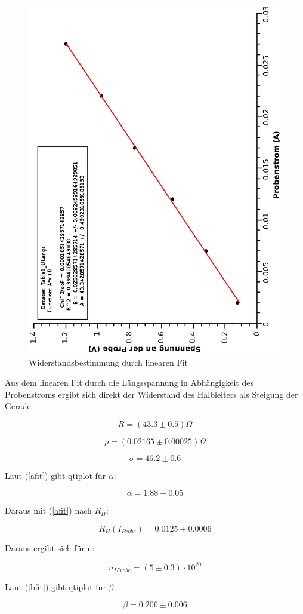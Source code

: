 \documentclass[12pt,a4paper,twopage]{article}
\begin{document}
\subsection*{}

\begin{figure}
\begin{center}

\includegraphics[width=0.4\linewidth, angle=-90]{widerstand.eps}
\caption{Widerstandsbestimmung durch linearen Fit}
\end{center}
\end{figure}

Aus dem linearen Fit durch die Längsspannung in Abhängigkeit des Probenstroms ergibt sich direkt der Widerstand des Halbleiters als Steigung der Gerade:

$$R = (43.3 \pm 0.5) \Omega $$

$$\rho = (0.02165 \pm 0.00025) \Omega $$

$$\sigma =  46.2 \pm 0.6 $$  



Laut (\ref{afit}) gibt qtiplot für $\alpha$:

$$ \alpha = 1.88 \pm 0.05 $$

Daraus mit (\ref{afit}) nach $R_H$:

\begin{center}
$$ \boxed{ R_H(I_{Probe}) = 0.0125 \pm 0.0006 } $$
\end{center}

Daraus ergibt sich für n:

\begin{center}
$$ \boxed{ n_{IProbe} = (5 \pm 0.3) \cdot 10^20  } $$
\end{center}

Laut (\ref{bfit}) gibt qtiplot für $\beta$:

$$ \beta =  0.206 \pm 0.006 $$
\end{document}
